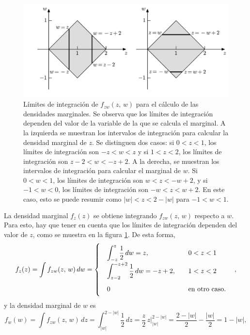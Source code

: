 \documentclass[a4paper]{report}
\begin{document}
\begin{figure}[!htb]
\begin{center}
 \includegraphics[width=0.84\columnwidth]{figuras/joint_distribution_sum_sub_marginals.pdf}
\caption{\label{fig:joint_distribution_sum_sub_marginals} Límites de integración de \(f_{zw}(z,\,w)\) para el cálculo de las densidades marginales. Se observa que los límites de integración dependen del valor de la variable de la que se calcula el marginal. A la izquierda se muestran los intervalos de integración para calcular la densidad marginal de \(z\). Se distinguen dos casos: si \(0<z<1\), los límites de integración son \(-z<w<z\) y si \(1<z<2\), los límites de integración son \(z-2<w<-z+2\). A la derecha, se muestran los intervalos de integración para calcular el marginal de \(w\). Si \(0<w<1\), los límites de integración son \(w<z<-w+2\), y si \(-1<w<0\), los límites de integración son \(-w<z<w+2\). En este caso, esto se puede resumir como \(|w|<z<2-|w|\) para \(-1<w<1\).}
\end{center}
\end{figure}
La densidad marginal \(f_z(z)\) se obtiene integrando \(f_{zw}(z,\,w)\) respecto a \(w\). Para esto, hay que tener en cuenta que los límites de integración dependen del valor de \(z\), como se muestra en la figura \ref{fig:joint_distribution_sum_sub_marginals}. 
De esta forma,
\begin{equation}\label{eq:joint_distribution_sum_sub_z}
 f_z(z)=\int f_{zw}(z,\,w)\,dw
\def\arraystretch{2}\arraycolsep=10pt
 =\left\{\begin{array}{ll}
   \displaystyle\int_{-z}^{z}\dfrac{1}{2}\,dw=z, &  0<z<1\\
   \displaystyle\int_{z-2}^{-z+2}\dfrac{1}{2}\,dw=-z+2, & 1<z<2\\ 
   0 & \textrm{en otro caso.}
 \end{array} \right., 
\end{equation}
y la densidad marginal de \(w\) es
\[
 f_w(w)=\int f_{zw}(z,\,w)\,dz=\int_{|w|}^{2-|w|}\dfrac{1}{2}\,dz=\frac{z}{2}\,z\bigg|_{|w|}^{2-|w|}
 =\frac{2-|w|}{2}-\frac{|w|}{2}=1-|w|,
\]
\end{document}
